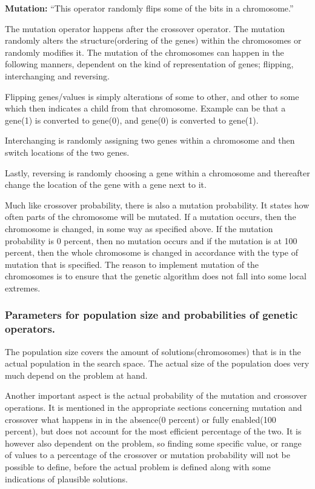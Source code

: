 \textbf{Mutation:} \enquote{This operator randomly flips some of the bits in a chromosome.} \cite[pp. 8]{Melanie1990}

The mutation operator happens after the crossover operator. The mutation randomly alters the structure(ordering of the genes) within the chromosomes or randomly modifies it.
The mutation of the chromosomes can happen in the following manners, dependent on the kind of representation of genes; flipping, interchanging and reversing.\cite[pp. 57]{Sivanandam2008}

Flipping genes/values is simply alterations of some to other, and other to some which then indicates a child from that chromosome. Example can be that a gene(1) is converted to gene(0), and gene(0) is converted to gene(1).

Interchanging is randomly assigning two genes within a chromosome and then switch locations of the two genes.

Lastly, reversing is randomly choosing a gene within a chromosome and thereafter change the location of the gene with a gene next to it.

Much like crossover probability, there is also a mutation probability. It states how often parts of the chromosome will be mutated. If a mutation occurs, then the chromosome is changed, in some way as specified above. If the mutation probability is 0 percent, then no mutation occurs and if the mutation is at 100 percent, then the whole chromosome is changed in accordance with the type of mutation that is specified. The reason to implement mutation of the chromosomes is to ensure that the genetic algorithm does not fall into some local extremes.\cite[pp. 57]{Sivanandam2008}

\subsubsection{Parameters for population size and probabilities of genetic operators.}\label{ssub:population}


The population size covers the amount of solutions(chromosomes) that is in the actual population in the search space. The actual size of the population does very much depend on the problem at hand.\cite[pp. 42]{Sivanandam2008}


Another important aspect is the actual probability of the mutation and crossover operations.
It is mentioned in the appropriate sections concerning mutation and crossover what happens in in the absence(0 percent) or fully enabled(100 percent), but does not account for the most efficient percentage of the two. It is however also dependent on the problem, so finding some specific value, or range of values to a percentage of the crossover or mutation probability will not be possible to define, before the actual problem is defined along with some indications of plausible solutions.


